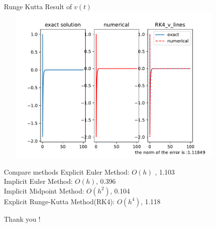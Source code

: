 \documentclass{beamer}
\begin{document}
 \begin{frame}{Runge Kutta Result of $v(t)$}
    \centering
    \includegraphics[height=8cm,width=12cm]{RK4_v_lines.pdf}
 \end{frame}


\begin{frame}{Compare methods }
    Explicit Euler Method:  $O(h)$ ,    1.103\\
    Implicit Euler Method: $O(h)$,     0.396\\
    Implicit Midpoint Method: $O(h^2)$,    0.104\\
    Explicit Runge-Kutta Method(RK4): $O(h^4)$,    1.118
\end{frame}
 \begin{frame}[standout]
    Thank you !
 \end{frame}
\end{document}

